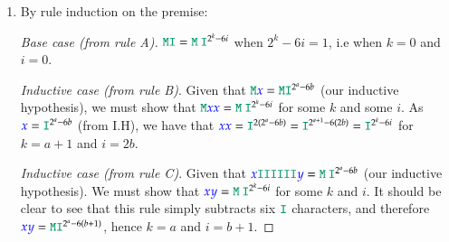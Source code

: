 \documentclass{book}
\begin{document}
\begin{enumerate}[label=1.\alph*)]
\begin{proof}[Base case (from rule 1)]
        \emph{Inductive case (from rule 3)}. Let $n$ be the number of
        $\conctt{I}$s in $\conctt{M}\meta{x}$. Our inductive hypothesis is that
        $3 \nmid n$. The number of $\conctt{I}$s in $\conctt{M}\meta{x x}$,
        clearly $2n$, is similarly indivisible, i.e $3 \nmid n$ implies $3 \nmid
        2n$ (as $3$ and $2$ are co-prime).
        
        \emph{Inductive case (from rule 4)}. Let $n$ be the number of $\conctt{I}$s in $\meta{x}\conctt{III}\meta{y}$. Our inductive hypothesis is that $3 \nmid n$. The number of $\conctt{I}$s in $\meta{x} \conctt{U}\meta{y}$, clearly $n - 3$, is similarly indivisible, i.e $3 \nmid n$ implies $3 \nmid (n-3)$
        
        \emph{Inductive case (from rule 5)}. Given that the number of $\conctt{I}$s in $\meta{x}\conctt{UU}\meta{y}$ is the same as the number of $\conctt{I}$s in $\meta{x y}$, our inductive hypothesis trivially proves our goal.
        
        \medskip
        
        Thus, by induction, no string in $\sansbold{Miu}$ has a number of $\conctt{I}$s divisible by three. Therefore, $\pred{\conctt{MU}}{Miu}$ is not admissible.        
\end{proof}
      \item By rule induction on the premise:

        \begin{proof}[Base case (from rule A)] $\conctt{MI} = \conctt{M\:I}^{2^k - 6i}$ when $2^k - 6i = 1$, i.e when $k = 0$ and $i = 0$.
          
          \emph{Inductive case (from rule B)}. Given that $\conctt{M}\meta{x} =
          \conctt{MI}^{2^a - 6b}$ (our inductive hypothesis), we must show that
          $\conctt{M}\meta{x x} = \conctt{M\:I}^{2^k - 6i}$ for some $k$ and
          some $i$. As $\meta{x} = \conctt{I}^{2^a - 6b}$ (from I.H), we have
          that $\meta{x x} = \conctt{I}^{2 (2^a - 6b)} = \conctt{I}^{2^{a + 1} -
            6(2b)} = \conctt{I}^{2^k - 6i}$ for $k = a + 1$ and $i = 2b$.
          
          \emph{Inductive case (from rule C)}. Given that $\meta{x} \conctt{IIIIII} \meta{y} = \conctt{M\:I}^{2^a - 6b}$ (our inductive hypothesis). We must show that $\meta{x y} = \conctt{M\:I}^{2^k - 6i}$ for some $k$ and $i$. It should be clear to see that this rule simply subtracts six $\conctt{I}$ characters, and therefore $\meta{x y} = \conctt{MI}^{2^a - 6(b + 1)}$, hence $k = a$ and $i = b + 1$.
          

\end{proof}
\end{enumerate}
\end{document}
